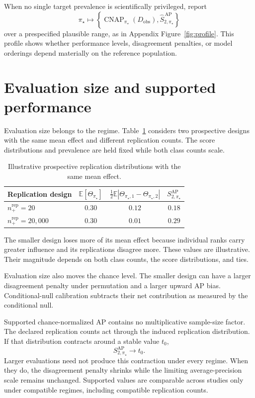 \documentclass[11pt]{article}
\newcommand{\CNAP}{\operatorname{CNAP}}
\newcommand{\Tpi}{\CNAP_{\pi_\star}}
\newcommand{\E}{\mathbb{E}}
\newcommand{\SAP}{S_{2,\pi_\star}^{\mathrm{AP}}}
\newcommand{\SAPHat}{\widehat S_{2,\pi_\star}^{\,\mathrm{AP}}}
\theoremstyle{remark}
\begin{document}
When no single target prevalence is scientifically privileged, report
\[
\pi_\star
\longmapsto
\left\{
\Tpi(D_{\mathrm{obs}}),
\SAPHat
\right\}
\]
over a prespecified plausible range, as in Appendix Figure~\ref{fig:profile}. This profile shows whether performance levels, disagreement penalties, or model orderings depend materially on the reference population.

\section{Evaluation size and supported performance}

Evaluation size belongs to the regime. Table~\ref{tab:illustration} considers two prospective designs with the same mean effect and different replication counts. The score distributions and prevalence are held fixed while both class counts scale.

\begin{table}[ht]
\centering
\caption{Illustrative prospective replication distributions with the same mean effect.}
\label{tab:illustration}
\begin{tabular}{@{}lccc@{}}
\toprule
Replication design & $\E[\Theta_{\pi_\star}]$ & $\tfrac12\E|\Theta_{\pi_\star,1}-\Theta_{\pi_\star,2}|$ & $\SAP$ \\
\midrule
$n_+^{\mathrm{rep}}=20$ & $0.30$ & $0.12$ & $0.18$ \\
$n_+^{\mathrm{rep}}=20{,}000$ & $0.30$ & $0.01$ & $0.29$ \\
\bottomrule
\end{tabular}
\end{table}

The smaller design loses more of its mean effect because individual ranks carry greater influence and its replications disagree more. These values are illustrative. Their magnitude depends on both class counts, the score distributions, and ties.

Evaluation size also moves the chance level. The smaller design can have a larger disagreement penalty under permutation and a larger upward AP bias. Conditional-null calibration subtracts their net contribution as measured by the conditional null.

Supported chance-normalized AP contains no multiplicative sample-size factor. The declared replication counts act through the induced replication distribution. If that distribution contracts around a stable value $t_0$,
\[
\SAP\longrightarrow t_0.
\]
Larger evaluations need not produce this contraction under every regime. When they do, the disagreement penalty shrinks while the limiting average-precision scale remains unchanged. Supported values are comparable across studies only under compatible regimes, including compatible replication counts.
\end{document}
